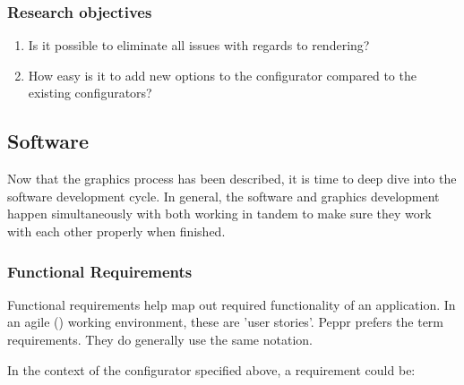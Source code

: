 \subsubsection{Research objectives}
\begin{enumerate}
	\item {Is it possible to eliminate all issues with regards to rendering?}
	\item {How easy is it to add new options to the configurator compared to the existing configurators?}
\end{enumerate}

\subsection{Software}
Now that the graphics process has been described, it is time to deep dive into the software development cycle. In general, the software and graphics development happen simultaneously with both working in tandem to make sure they work with each other properly when finished.
​
\subsubsection{Functional Requirements}
Functional requirements help map out required functionality of an application. In an agile (\cite{agileUserStories}) working environment, these are 'user stories'. Peppr prefers the term requirements. They do generally use the same notation. \newline

\newline

In the context of the configurator specified above, a requirement could be: \newline

\newline

